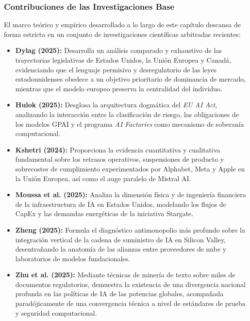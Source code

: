 \subsubsection*{Contribuciones de las Investigaciones Base}
El marco teórico y empírico desarrollado a lo largo de este capítulo descansa de forma estricta en un conjunto de investigaciones científicas arbitradas recientes:
\begin{itemize}[leftmargin=1.5em, itemsep=0.15em, topsep=0.15em]
    \item \textbf{Dylag (2025):} Desarrolla un análisis comparado y exhaustivo de las trayectorias legislativas de Estados Unidos, la Unión Europea y Canadá, evidenciando que el lenguaje permisivo y desregulatorio de las leyes estadounidenses obedece a un objetivo prioritario de dominancia de mercado, mientras que el modelo europeo preserva la centralidad del individuo.
    \item \textbf{Hulok (2025):} Desglosa la arquitectura dogmática del \textit{EU AI Act}, analizando la interacción entre la clasificación de riesgo, las obligaciones de los modelos GPAI y el programa \textit{AI Factories} como mecanismo de soberanía computacional.
    \item \textbf{Kshetri (2024):} Proporciona la evidencia cuantitativa y cualitativa fundamental sobre los retrasos operativos, suspensiones de producto y sobrecostes de cumplimiento experimentados por Alphabet, Meta y Apple en la Unión Europea, así como el auge paralelo de Mistral AI.
    \item \textbf{Moussa et al. (2025):} Analiza la dimensión física y de ingeniería financiera de la infraestructura de IA en Estados Unidos, modelando los flujos de CapEx y las demandas energéticas de la iniciativa Stargate.
    \item \textbf{Zheng (2025):} Formula el diagnóstico antimonopolio más profundo sobre la integración vertical de la cadena de suministro de IA en Silicon Valley, desentrañando la anatomía de las alianzas entre proveedores de nube y laboratorios de modelos fundacionales.
    \item \textbf{Zhu et al. (2025):} Mediante técnicas de minería de texto sobre miles de documentos regulatorios, demuestra la existencia de una divergencia nacional profunda en las políticas de IA de las potencias globales, acompañada paradójicamente de una convergencia técnica a nivel de estándares de prueba y seguridad computacional.
\end{itemize}

\newpage
{}

